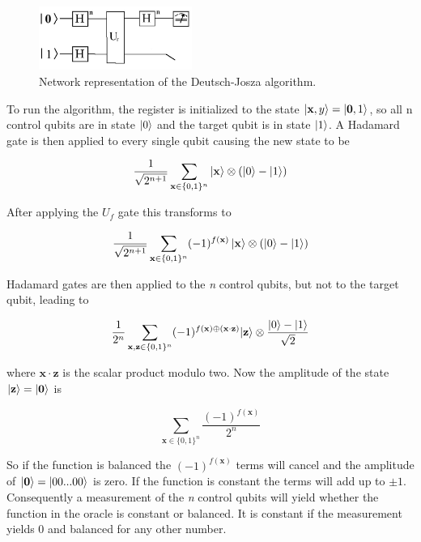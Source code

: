\begin{figure}[H]
	\centering
	\includegraphics[width=50mm]{./images/deutsch2}
	\caption{Network representation of the Deutsch-Josza algorithm.}
\end{figure}

To run the algorithm, the register is initialized to the state \begin{math} \left| \mathbf{x},y \right> = \left| \mathbf{0},1 \right>\end{math}, so all n control qubits are in state \(\left| 0 \right>\) and the target qubit is in state \(\left| 1 \right>\). A Hadamard gate is then applied to every single qubit causing the new state to be

\begin{equation}
 \frac{1}{\sqrt{2^{n+1}}} \sum_{\mathbf{x} \in \{0,1\}^n} \left| \mathbf{x} \right> \otimes (\left| 0 \right> - \left| 1 \right>) 
\end{equation}


After applying the \(U_f\) gate this transforms to

\begin{equation}
 \frac{1}{\sqrt{2^{n+1}}} \sum_{\mathbf{x} \in \{0,1\}^n} (-1)^{f(\mathbf{x})} \left| \mathbf{x} \right> \otimes (\left| 0 \right> - \left| 1 \right>) 
\end{equation}

Hadamard gates are then applied to the \emph{n} control qubits, but not to the target qubit, leading to

\begin{equation}
 \frac{1}{2^{n}} \sum_{\mathbf{x},\mathbf{z}\in\{0,1\}^n} (-1)^{f(\mathbf{x})\oplus (\mathbf{x} \cdot \mathbf{z})} |\mathbf{z} \rangle \otimes \frac{\left| 0 \right> - \left| 1 \right>}{\sqrt{2}}
\end{equation}

where \( \mathbf{x} \cdot \mathbf{z} \) is the scalar product modulo two. Now the amplitude of the state \begin{math} |\mathbf{z}\rangle = \left| \mathbf{0} \right> \end{math} is 

\begin{equation}
 \sum_{\mathbf{x} \in\{0,1\}^n} \frac{(-1)^{f(\mathbf{x})}}{2^n}
\end{equation}

So if the function is balanced the \( (-1)^{ f( \mathbf{x} ) } \) terms will cancel and the amplitude of \(\left| \mathbf{0} \right> = \left| 00...00 \right>\) is zero. If the function is constant the terms will add up to \(\pm1\). Consequently a measurement of the \emph{n} control qubits will yield whether the function in the oracle is constant or balanced. It is constant if the measurement yields 0 and balanced for any other number\cite{cleve1998, stolze2008}.

